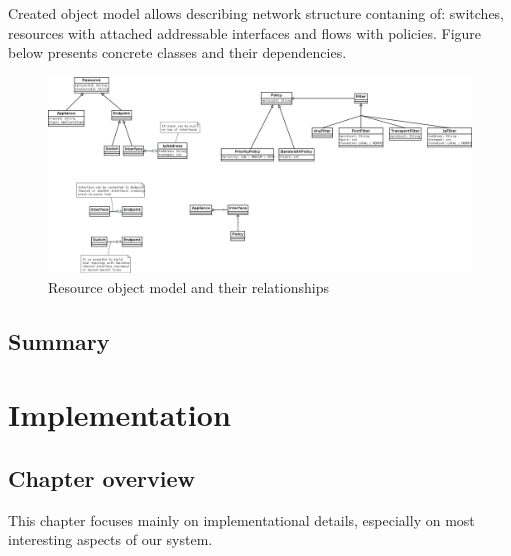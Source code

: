 \documentclass[11pt]{book}
\begin{document}
    Created object model allows describing network structure contaning of: switches, resources with attached addressable 
    interfaces and flows with policies. Figure below presents concrete classes and their dependencies. 

        \begin{figure}[H]
          \begin{center}
            \includegraphics[angle=90, height=0.9\textwidth]{img/impl/resource-object-model.png}
          \end{center}
          \caption{Resource object model and their relationships}
        \end{figure}        


    \section*{Summary}


  \chapter{Implementation}
    
    \section*{Chapter overview}
	
	This chapter focuses mainly on implementational details, especially on most interesting aspects of our system.
		
\end{document}
